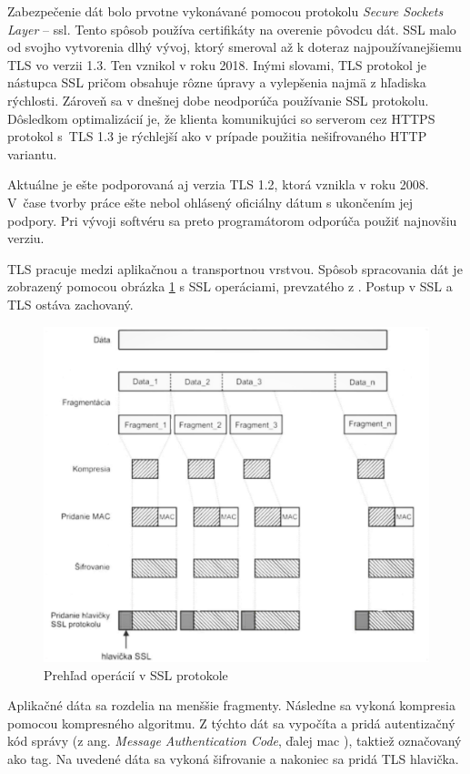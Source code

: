 Zabezpečenie dát bolo prvotne vykonávané pomocou protokolu \textit{Secure Sockets Layer} -- \acrshort{ssl}. Tento spôsob používa certifikáty na overenie pôvodcu dát. SSL malo od svojho vytvorenia dlhý vývoj, ktorý smeroval až k doteraz najpoužívanejšiemu TLS vo verzii 1.3. Ten vznikol v roku 2018. Inými slovami, TLS protokol je nástupca SSL pričom obsahuje rôzne úpravy a vylepšenia najmä z hľadiska rýchlosti. Zároveň sa v dnešnej dobe neodporúča používanie SSL protokolu. Dôsledkom optimalizácií je, že klienta komunikujúci so serverom cez HTTPS protokol s~TLS 1.3 je rýchlejší ako v prípade použitia nešifrovaného HTTP variantu. 

Aktuálne je ešte podporovaná aj verzia TLS 1.2, ktorá vznikla v roku 2008. V~čase tvorby práce ešte nebol ohlásený oficiálny dátum s ukončením jej podpory. Pri vývoji softvéru sa preto programátorom odporúča použiť najnovšiu verziu. 

TLS pracuje medzi aplikačnou a transportnou vrstvou. Spôsob spracovania dát je zobrazený pomocou obrázka \ref{ssl} s SSL operáciami, prevzatého z \cite{biks}. Postup v SSL a TLS ostáva zachovaný.
 
\begin{figure}[!ht]
	\centering
	\includegraphics[width=0.8\linewidth]{figures/ssl}
	\caption{Prehľad operácií v SSL protokole \cite{tls}}
	\label{ssl}
\end{figure}
Aplikačné dáta sa rozdelia na menššie fragmenty. Následne sa vykoná kompresia pomocou kompresného algoritmu. Z týchto dát sa vypočíta a pridá autentizačný kód správy (z ang. \textit{Message Authentication Code}, ďalej \acrshort{mac} \cite{mac}), taktiež označovaný ako tag. Na uvedené dáta sa vykoná šifrovanie a nakoniec sa pridá TLS hlavička.
   

